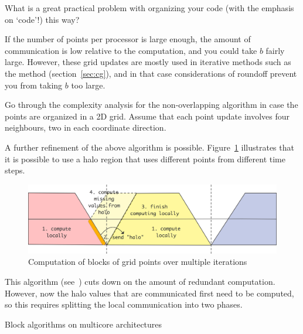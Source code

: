 \begin{exercise}
  What is a great practical problem with organizing your code (with
  the emphasis on `code'!) this way?
\end{exercise}

If the number of points per processor is large enough, the amount of
communication is low relative to the computation, and you could take
$b$ fairly large. However, these grid updates are mostly used in
iterative methods such as the  method
(section~\ref{sec:cg}), and in that case considerations of roundoff
prevent you from taking $b$ too large\cite{ChGe:sstep}.

\begin{exercise}
  Go through the complexity analysis for the non-overlapping algorithm
  in case the points are organized in a 2D grid. Assume that each
  point update involves four neighbours, two in each coordinate
  direction.
\end{exercise}

A further refinement of the above algorithm is possible.
Figure~\ref{fig:grid-update-minimal} illustrates that it is possible
to use a halo region that uses different points from different time steps.
\begin{figure}[ht]
\includegraphics[scale=.1]{graphics/grid-update-minimal}
\caption{Computation of blocks of grid points over multiple iterations}
\label{fig:grid-update-minimal}
\end{figure}
This algorithm (see~\cite{Demmel2008IEEE:avoiding}) cuts down on the amount
of redundant computation. However, now the halo values that are communicated
first need to be computed, so this requires splitting the local communication
into two phases.

 {Block algorithms on multicore architectures}
\label{sec:multicore-block}


